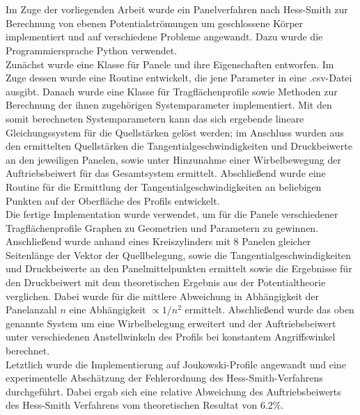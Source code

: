 \chapter*{\abstractname} %
Im Zuge der vorliegenden Arbeit wurde ein Panelverfahren nach Hess-Smith zur Berechnung von ebenen Potentialströmungen um geschlossene Körper implementiert und auf verschiedene Probleme angewandt. Dazu wurde die Programmiersprache Python verwendet.
\\
Zunächst wurde eine Klasse für Panele und ihre Eigenschaften entworfen. Im Zuge dessen wurde eine Routine entwickelt, die jene Parameter in eine .csv-Datei ausgibt. Danach wurde eine Klasse für Tragflächenprofile sowie Methoden zur Berechnung der ihnen zugehörigen Systemparameter implementiert. Mit den somit berechneten Systemparametern kann das sich ergebende lineare Gleichungssystem für die Quellstärken gelöst werden; im Anschluss wurden aus den ermittelten Quellstärken die Tangentialgeschwindigkeiten und Druckbeiwerte an den jeweiligen Panelen, sowie unter Hinzunahme einer Wirbelbewegung der Auftriebsbeiwert für das Gesamtsystem ermittelt. Abschließend wurde eine Routine für die Ermittlung der Tangentialgeschwindigkeiten an beliebigen Punkten auf der Oberfläche des Profils entwickelt.
\\
Die fertige Implementation wurde verwendet, um für die Panele verschiedener Tragflächenprofile Graphen zu Geometrien und Parametern zu gewinnen. Anschließend wurde anhand eines Kreiszylinders mit 8 Panelen gleicher Seitenlänge der Vektor der Quellbelegung, sowie die Tangentialgeschwindigkeiten und Druckbeiwerte an den Panelmittelpunkten ermittelt sowie die Ergebnisse für den Druckbeiwert mit dem theoretischen Ergebnis aus der Potentialtheorie verglichen. Dabei wurde für die mittlere Abweichung in Abhängigkeit der Panelanzahl $n$ eine Abhängigkeit $\propto 1 / n^2$ ermittelt. Abschließend wurde das oben genannte System um eine Wirbelbelegung erweitert und der Auftriebsbeiwert unter verschiedenen Anstellwinkeln des Profils bei konstantem Angriffswinkel berechnet. 
\\
Letztlich wurde die Implementierung auf Joukowski-Profile angewandt und eine experimentelle Abschätzung der Fehlerordnung des Hess-Smith-Verfahrens durchgeführt. Dabei ergab sich eine relative Abweichung des Auftriebsbeiwerts des Hess-Smith Verfahrens vom theoretischen Resultat von $6.2 \%$.

\newpage
